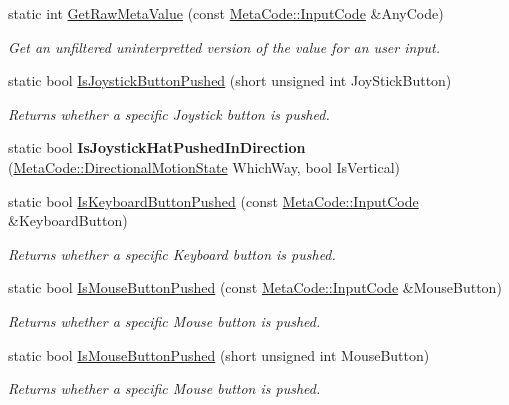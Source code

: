 \begin{DoxyCompactItemize}
static int \hyperlink{classphys_1_1InputQueryTool_a44ad555f277bf035648fb1eeddb94514}{GetRawMetaValue} (const \hyperlink{classphys_1_1MetaCode_a3e501cbb5bf0f6f1fdb7211465bda8d8}{MetaCode::InputCode} \&AnyCode)
\begin{DoxyCompactList}\small\item\em Get an unfiltered uninterpretted version of the value for an user input. \item\end{DoxyCompactList}\item 
static bool \hyperlink{classphys_1_1InputQueryTool_ae3e63f8f93a0b270b22e685d3b86c890}{IsJoystickButtonPushed} (short unsigned int JoyStickButton)
\begin{DoxyCompactList}\small\item\em Returns whether a specific Joystick button is pushed. \item\end{DoxyCompactList}\item 
\hypertarget{classphys_1_1InputQueryTool_a47b0d887f62fcd43f75308c6269e8411}{
static bool {\bfseries IsJoystickHatPushedInDirection} (\hyperlink{classphys_1_1MetaCode_ad6ed6266b5f4219a6f5da29ebe018757}{MetaCode::DirectionalMotionState} WhichWay, bool IsVertical)}
\label{classphys_1_1InputQueryTool_a47b0d887f62fcd43f75308c6269e8411}

\item 
static bool \hyperlink{classphys_1_1InputQueryTool_a3d8efa04d2f98c35d60a4086f930778a}{IsKeyboardButtonPushed} (const \hyperlink{classphys_1_1MetaCode_a3e501cbb5bf0f6f1fdb7211465bda8d8}{MetaCode::InputCode} \&KeyboardButton)
\begin{DoxyCompactList}\small\item\em Returns whether a specific Keyboard button is pushed. \item\end{DoxyCompactList}\item 
static bool \hyperlink{classphys_1_1InputQueryTool_ab061aab57ff35cb1c18656f5ee4f384e}{IsMouseButtonPushed} (const \hyperlink{classphys_1_1MetaCode_a3e501cbb5bf0f6f1fdb7211465bda8d8}{MetaCode::InputCode} \&MouseButton)
\begin{DoxyCompactList}\small\item\em Returns whether a specific Mouse button is pushed. \item\end{DoxyCompactList}\item 
static bool \hyperlink{classphys_1_1InputQueryTool_aab9a7be4d95289d828378f7f3d5fc065}{IsMouseButtonPushed} (short unsigned int MouseButton)
\begin{DoxyCompactList}\small\item\em Returns whether a specific Mouse button is pushed. \item\end{DoxyCompactList}\end{DoxyCompactItemize}
